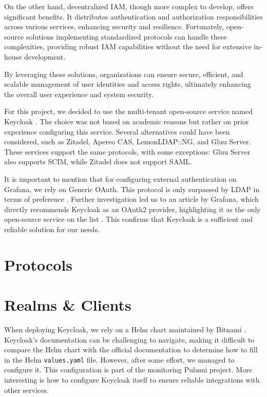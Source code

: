 On the other hand, decentralized IAM, though more complex to develop, offers significant benefits. It distributes authentication and authorization responsibilities across various services, enhancing security and resilience. Fortunately, open-source solutions implementing standardized protocols can handle these complexities, providing robust IAM capabilities without the need for extensive in-house development.

By leveraging these solutions, organizations can ensure secure, efficient, and scalable management of user identities and access rights, ultimately enhancing the overall user experience and system security.

For this project, we decided to use the multi-tenant open-source service named Keycloak \parencite{keycloak}. The choice was not based on academic reasons but rather on prior experience configuring this service. Several alternatives could have been considered, such as Zitadel, Apereo CAS, LemonLDAP::NG, and Gluu Server. These services support the same protocols, with some exceptions: Gluu Server also supports SCIM, while Zitadel does not support SAML. 

It is important to mention that for configuring external authentication on Grafana, we rely on Generic OAuth. This protocol is only surpassed by LDAP in terms of preference \parencite{grafana_authentication}. Further investigation led us to an article by Grafana, which directly recommends Keycloak as an OAuth2 provider, highlighting it as the only open-source service on the list \parencite{grafana_oauth}. This confirms that Keycloak is a sufficient and reliable solution for our needs.

\section{Protocols}

\section{Realms \& Clients}
When deploying Keycloak, we rely on a Helm chart maintained by Bitnami \parencite{bitnami_keycloak}. Keycloak's documentation can be challenging to navigate, making it difficult to compare the Helm chart with the official documentation to determine how to fill in the Helm \texttt{values.yaml} file. However, after some effort, we managed to configure it. This configuration is part of the monitoring Pulumi project. More interesting is how to configure Keycloak itself to ensure reliable integrations with other services.

